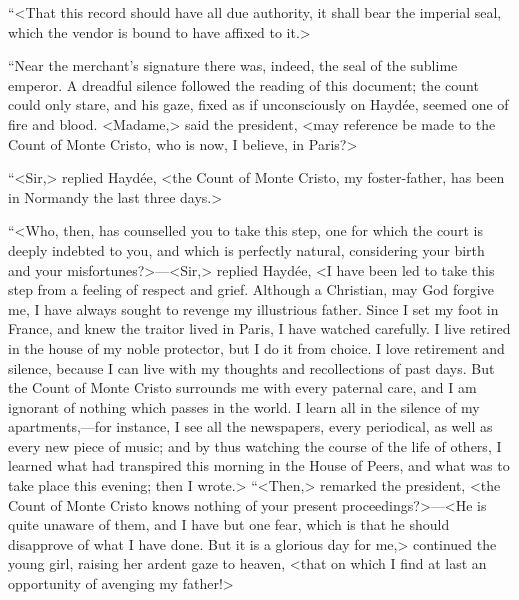  “<That this record should have all due authority, it shall bear the imperial seal, which the vendor is bound to have affixed to it.> 

 “Near the merchant's signature there was, indeed, the seal of the sublime emperor. A dreadful silence followed the reading of this document; the count could only stare, and his gaze, fixed as if unconsciously on Haydée, seemed one of fire and blood. <Madame,> said the president, <may reference be made to the Count of Monte Cristo, who is now, I believe, in Paris?> 

 “<Sir,> replied Haydée, <the Count of Monte Cristo, my foster-father, has been in Normandy the last three days.> 

 “<Who, then, has counselled you to take this step, one for which the court is deeply indebted to you, and which is perfectly natural, considering your birth and your misfortunes?>—<Sir,> replied Haydée, <I have been led to take this step from a feeling of respect and grief. Although a Christian, may God forgive me, I have always sought to revenge my illustrious father. Since I set my foot in France, and knew the traitor lived in Paris, I have watched carefully. I live retired in the house of my noble protector, but I do it from choice. I love retirement and silence, because I can live with my thoughts and recollections of past days. But the Count of Monte Cristo surrounds me with every paternal care, and I am ignorant of nothing which passes in the world. I learn all in the silence of my apartments,—for instance, I see all the newspapers, every periodical, as well as every new piece of music; and by thus watching the course of the life of others, I learned what had transpired this morning in the House of Peers, and what was to take place this evening; then I wrote.>  “<Then,> remarked the president, <the Count of Monte Cristo knows nothing of your present proceedings?>—<He is quite unaware of them, and I have but one fear, which is that he should disapprove of what I have done. But it is a glorious day for me,> continued the young girl, raising her ardent gaze to heaven, <that on which I find at last an opportunity of avenging my father!> 

